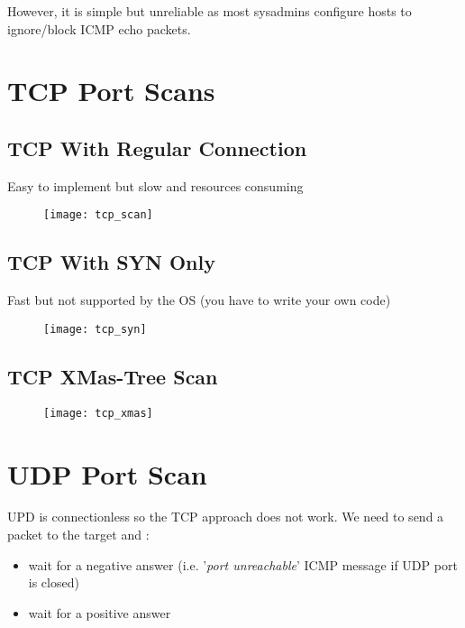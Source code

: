 However, it is simple but unreliable as most sysadmins configure hosts to ignore/block ICMP echo packets.

\section{TCP Port Scans}

\begin{minipage}[t]{0.45\textwidth}
    \subsection{TCP With Regular Connection}
    Easy to implement but slow and resources consuming
	\begin{figure}[H]
		\centering
		\texttt{[image: tcp\_scan]}
	\end{figure}
\end{minipage}
\hfill
\begin{minipage}[t]{0.45\textwidth}
    \subsection{TCP With SYN Only}
    Fast but not supported by the OS (you have to write your own code)
	\begin{figure}[H]
		\centering
		\texttt{[image: tcp\_syn]}
	\end{figure}
\end{minipage}

\subsection{TCP XMas-Tree Scan}

\begin{figure}[H]
    \centering
    \texttt{[image: tcp\_xmas]}
\end{figure}

\section{UDP Port Scan}

UPD is connectionless so the TCP approach does not work. We need to send a packet to the target and :
\begin{itemize}
    \item wait for a negative answer (i.e. '\textit{port unreachable}' ICMP message if UDP port is closed)
    \item wait for a positive answer
\end{itemize}

